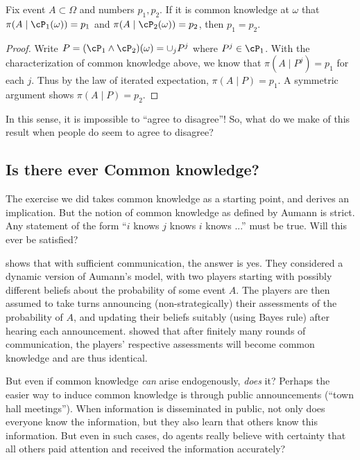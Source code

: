 \begin{proposition}
  Fix event \(A \subset \Omega\) and numbers \(p_1, p_2\).
  If it is common knowledge at \(\omega\) that \(\pi(A \mid \cP_1(\omega)) = p_1\) and \(\pi(A \mid \cP_2(\omega)) = p_2\), then \(p_1 = p_2\).
\end{proposition}
\begin{proof}
  Write \(P = (\cP_1 \land \cP_2)(\omega) = \cup_j P^j\) where \(P^j \in \cP_1\).
  With the characterization of common knowledge above, we know that \(\pi(A \mid P^j) = p_1\) for each \(j\).
  Thus by the law of iterated expectation, \(\pi(A \mid P) = p_1\).
  A symmetric argument shows \(\pi(A \mid P) = p_2\).
\end{proof}


In this sense, it is impossible to ``agree to disagree''!
So, what do we make of this result when people do seem to agree to disagree?


\subsection{Is there ever Common knowledge?}
The exercise we did takes common knowledge as a starting point, and derives an implication.
But the notion of common knowledge as defined by Aumann is strict.
Any statement of the form ``\(i\) knows \(j\) knows \(i\) knows ...'' must be true.
Will this ever be satisfied?

\Textcite{GeanakoplosPolemarchakis1982} shows that with sufficient communication, the answer is yes.
They considered a dynamic version of Aumann's model, with two players starting with possibly different beliefs about the probability of some event \(A\).
The players are then assumed to take turns announcing (non-strategically) their assessments of the probability of \(A\), and updating their beliefs suitably (using Bayes rule) after hearing each announcement.
\Textcite{GeanakoplosPolemarchakis1982} showed that after finitely many rounds of communication, the players' respective assessments will become common knowledge and are thus identical.


But even if common knowledge \emph{can} arise endogenously, \emph{does} it?
Perhaps the easier way to induce common knowledge is through public announcements (``town hall meetings'').
When information is disseminated in public, not only does everyone know the information, but they also learn that others know this information.
But even in such cases, do agents really believe with certainty that all others paid attention and received the information accurately?

